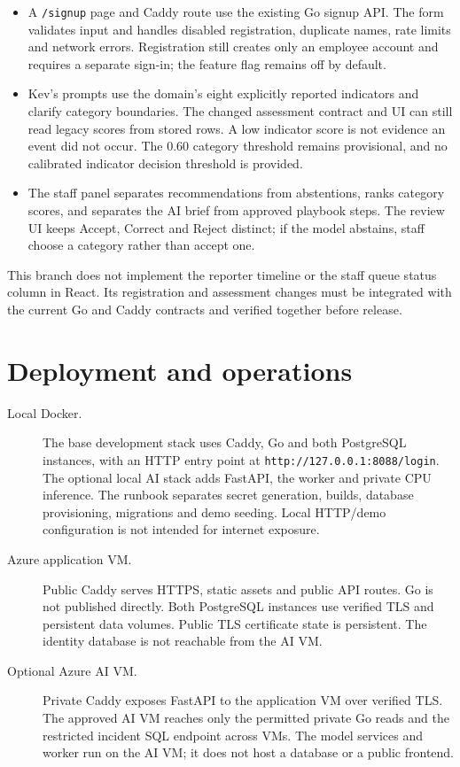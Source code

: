 \documentclass[11pt,a4paper]{article}
\newcommand{\route}[1]{\nolinkurl{#1}}
\begin{document}
\begin{itemize}
  \item A \route{/signup} page and Caddy route use the existing Go signup API.
    The form validates input and handles disabled registration, duplicate
    names, rate limits and network errors. Registration still creates only
    an employee account and requires a separate sign-in; the feature flag
    remains off by default.
  \item Kev's prompts use the domain's eight explicitly reported indicators
    and clarify category boundaries. The changed assessment contract and UI
    can still read legacy scores from stored rows. A low indicator score is
    not evidence an event did not occur. The 0.60 category threshold remains
    provisional, and no calibrated indicator decision threshold is provided.
  \item The staff panel separates recommendations from abstentions, ranks
    category scores, and separates the AI brief from approved playbook steps.
    The review UI keeps Accept, Correct and Reject distinct; if the model
    abstains, staff choose a category rather than accept one.
\end{itemize}

This branch does not implement the reporter timeline or the staff queue
status column in React. Its registration and assessment changes must be
integrated with the current Go and Caddy contracts and verified together
before release.

\section{Deployment and operations}

\begin{description}
  \item[Local Docker.] The base development stack uses Caddy, Go and both
    PostgreSQL instances, with an HTTP entry point at
    \route{http://127.0.0.1:8088/login}. The optional local AI stack adds FastAPI,
    the worker and private CPU inference. The runbook separates secret
    generation, builds, database provisioning, migrations and demo seeding.
    Local HTTP/demo configuration is not intended for internet exposure.
  \item[Azure application VM.] Public Caddy serves HTTPS, static assets and
    public API routes. Go is not published directly. Both PostgreSQL instances
    use verified TLS and persistent data volumes. Public TLS certificate
    state is persistent. The identity database is not reachable from the AI VM.
  \item[Optional Azure AI VM.] Private Caddy exposes FastAPI to the application
    VM over verified TLS. The approved AI VM reaches only the permitted
    private Go reads and the restricted incident SQL endpoint across VMs.
    The model services and worker run on the AI VM; it does not host a
    database or a public frontend.
\end{description}
\end{document}
